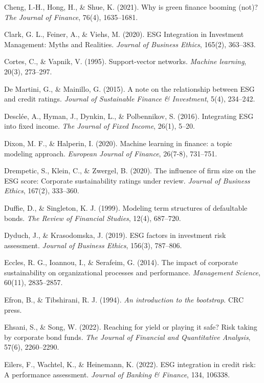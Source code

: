 \begin{thebibliography}{100}
Cheng, I.-H., Hong, H., \& Shue, K. (2021). Why is green finance booming (not)? \textit{The Journal of Finance}, 76(4), 1635--1681.

Clark, G. L., Feiner, A., \& Viehs, M. (2020). ESG Integration in Investment Management: Myths and Realities. \textit{Journal of Business Ethics}, 165(2), 363--383.

Cortes, C., \& Vapnik, V. (1995). Support-vector networks. \textit{Machine learning}, 20(3), 273--297.

De Martini, G., \& Mainillo, G. (2015). A note on the relationship between ESG and credit ratings. \textit{Journal of Sustainable Finance \& Investment}, 5(4), 234--242.

Desclée, A., Hyman, J., Dynkin, L., \& Polbennikov, S. (2016). Integrating ESG into fixed income. \textit{The Journal of Fixed Income}, 26(1), 5--20.

Dixon, M. F., \& Halperin, I. (2020). Machine learning in finance: a topic modeling approach. \textit{European Journal of Finance}, 26(7-8), 731--751.

Drempetic, S., Klein, C., \& Zwergel, B. (2020). The influence of firm size on the ESG score: Corporate sustainability ratings under review. \textit{Journal of Business Ethics}, 167(2), 333--360.

Duffie, D., \& Singleton, K. J. (1999). Modeling term structures of defaultable bonds. \textit{The Review of Financial Studies}, 12(4), 687--720.

Dyduch, J., \& Krasodomska, J. (2019). ESG factors in investment risk assessment. \textit{Journal of Business Ethics}, 156(3), 787--806.

Eccles, R. G., Ioannou, I., \& Serafeim, G. (2014). The impact of corporate sustainability on organizational processes and performance. \textit{Management Science}, 60(11), 2835--2857.

Efron, B., \& Tibshirani, R. J. (1994). \textit{An introduction to the bootstrap}. CRC press.

Ehsani, S., \& Song, W. (2022). Reaching for yield or playing it safe? Risk taking by corporate bond funds. \textit{The Journal of Financial and Quantitative Analysis}, 57(6), 2260--2290.

Eilers, F., Wachtel, K., \& Heinemann, K. (2022). ESG integration in credit risk: A performance assessment. \textit{Journal of Banking \& Finance}, 134, 106338.


\end{thebibliography}
